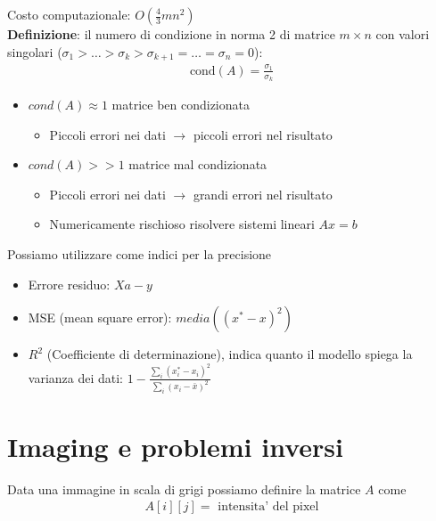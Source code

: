 \documentclass[a4paper,12pt]{article}
\begin{document}
Costo computazionale: $O(\frac{4}{3}mn^2)$\\
\textbf{Definizione}: il numero di condizione in norma 2 di matrice $m \times n$ con valori singolari ($\sigma_1 > \dots > \sigma_k > \sigma_{k+1} = \dots = \sigma_n = 0$):
\label{sec:cond}
\begin{align*}
    \text{cond}(A) = \frac{\sigma_1}{\sigma_k}
\end{align*}
\begin{itemize}
    \item $cond(A) \approx 1$ matrice ben condizionata
    \begin{itemize}
        \item Piccoli errori nei dati $\to$ piccoli errori nel risultato
    \end{itemize}
    \item $cond(A) >> 1$ matrice mal condizionata
    \begin{itemize}
        \item Piccoli errori nei dati $\to$ grandi errori nel risultato
        \item Numericamente rischioso risolvere sistemi lineari $Ax=b$
    \end{itemize}
\end{itemize}
Possiamo utilizzare come indici per la precisione
\begin{itemize}
    \item Errore residuo: $Xa-y$
    \item MSE (mean square error): $media((x^* -x)^2)$
    \item $R^2$ (Coefficiente di determinazione), indica quanto il modello spiega la varianza dei dati: $1 - \frac{\sum_i (x^*_i - x_i)^2}{\sum_i (x_i - \bar{x})^2}$
\end{itemize}
\pagebreak
\section{Imaging e problemi inversi}
Data una immagine in scala di grigi possiamo definire la matrice $A$ come
\begin{align*}
    A[i][j] = \text{ intensita' del pixel}
\end{align*}
\end{document}

